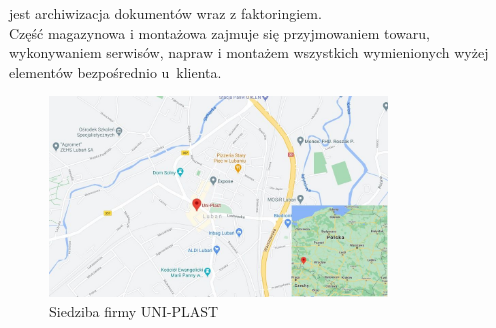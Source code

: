 \documentclass[12pt,a4paper]{article}
\begin{document}
			jest archiwizacja dokumentów wraz z faktoringiem.\\
		\indent Część magazynowa i montażowa zajmuje się przyjmowaniem towaru, wykonywaniem serwisów, napraw i montażem wszystkich wymienionych wyżej elementów bezpośrednio
			u~klienta.
		\begin{figure}[H]
			\centering
			\includegraphics[width=0.8\textwidth]{img/siedziba.jpg}
			\caption{Siedziba firmy UNI-PLAST}
			\label{fig:lokalizacja}
		\end{figure}

	\newpage

\end{document}
